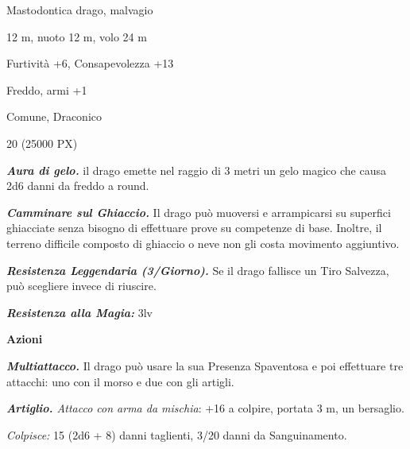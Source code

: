 \begin{multicols}{2}
{
\begin{description}[noitemsep, topsep=0pt, parsep=0pt, partopsep=0pt, itemsep=1pt, leftmargin=2.35cm,  labelwidth=2.2cm, itemindent=0cm, listparindent=0pt] %
\setlength{\baselineskip}{10pt}
\item[\textbf{Taglia/Tipo}] Mastodontica drago, malvagio
\item[\textbf{Caratt.}] 
\item[\textbf{Punti Ferita}] 
\item[\textbf{Movimento}] 12 m, nuoto 12 m, volo 24 m
\item[\textbf{Tiri Salvez.}] 
\item[\textbf{Comp.}] Furtività +6, Consapevolezza +13
\item[\textbf{Imm. Danni}] Freddo, armi +1
\item[\textbf{Sensi}] 
\item[\textbf{Linguaggi}] Comune, Draconico
\item[\textbf{Sfida}] 20 (25000 PX)
\end{description}
\smallskip

\emph{\textbf{Aura di gelo.}} il drago emette nel raggio di 3 metri un gelo magico che causa 2d6 danni da freddo a round.

\emph{\textbf{Camminare sul Ghiaccio.}} Il drago può muoversi e arrampicarsi su superfici ghiacciate senza bisogno di effettuare prove su competenze di base. Inoltre, il terreno difficile composto di ghiaccio o neve non gli costa movimento aggiuntivo.

\emph{\textbf{Resistenza Leggendaria (3/Giorno).}} Se il drago fallisce un Tiro Salvezza, può scegliere invece di riuscire.

\emph{\textbf{Resistenza alla Magia:}} 3lv

\textbf{Azioni}

\emph{\textbf{Multiattacco.}} Il drago può usare la sua Presenza Spaventosa e poi effettuare tre attacchi: uno con il morso e due con gli artigli.

\emph{\textbf{Artiglio.} Attacco con arma da mischia}: +16 a colpire, portata 3 m, un bersaglio.

\emph{Colpisce:} 15 (2d6 + 8) danni taglienti, 3/20 danni da Sanguinamento.

}
\end{multicols}
